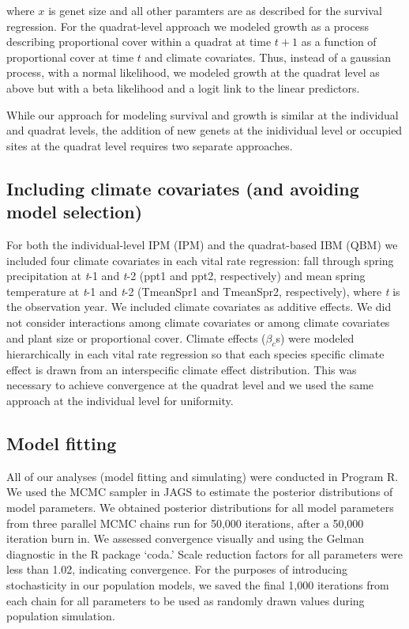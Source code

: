 \documentclass[12pt]{article}
\begin{document}
\noindent where $x$ is genet size and all other paramters are as described for the survival regression. For the quadrat-level approach we modeled growth as a process describing proportional cover within a quadrat at time $t+1$ as a function of proportional cover at time $t$ and climate covariates. Thus, instead of a gaussian process, with a normal likelihood, we modeled growth at the quadrat level as above but with a beta likelihood and a logit link to the linear predictors.  

While our approach for modeling survival and growth is similar at the individual and quadrat levels, the addition of new genets at the inidividual level or occupied sites at the quadrat level requires two separate approaches.

\subsection{Including climate covariates (and avoiding model selection)}
For both the individual-level IPM (IPM) and the quadrat-based IBM (QBM) we included four climate covariates in each vital rate regression: fall through spring precipitation at \emph{t}-1 and \emph{t}-2 (ppt1 and ppt2, respectively) and mean spring temperature at \emph{t}-1 and \emph{t}-2 (TmeanSpr1 and TmeanSpr2, respectively), where \emph{t} is the observation year. We included climate covariates as additive effects. We did not consider interactions among climate covariates or among climate covariates and plant size or proportional cover. Climate effects ($\beta_{c}$s) were modeled hierarchically in each vital rate regression so that each species specific climate effect is drawn from an interspecific climate effect distribution. This was necessary to achieve convergence at the quadrat level and we used the same approach at the individual level for uniformity.

\subsection{Model fitting}
All of our analyses (model fitting and simulating) were conducted in Program R. We used the MCMC sampler in JAGS to estimate the posterior distributions of model parameters. We obtained posterior distributions for all model parameters from three parallel MCMC chains run for 50,000 iterations, after a 50,000 iteration burn in. We assessed convergence visually and using the Gelman diagnostic in the R package `coda.' Scale reduction factors for all parameters were less than 1.02, indicating convergence. For the purposes of introducing stochasticity in our population models, we saved the final 1,000 iterations from each chain for all parameters to be used as randomly drawn values during population simulation.
\end{document}

